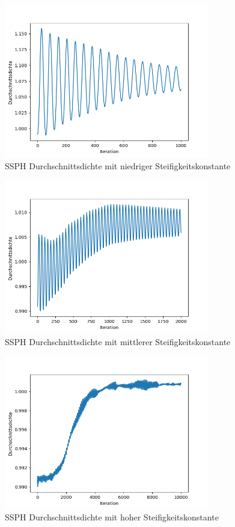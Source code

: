 \documentclass{scrreprt}
\begin{document}
\begin{figure}[htb]
    \includegraphics[width=0.8\textwidth]{average_density_ssph_low_stiffness.png}
    \caption{SSPH Durchschnittsdichte mit niedriger Steifigkeitskonstante}
    \label{image:average_density_ssph_low_stiffness}
\end{figure}

\begin{figure}[htb]
    \includegraphics[width=0.8\textwidth]{average_density_ssph_mid_stiffness.png}
    \caption{SSPH Durchschnittsdichte mit mittlerer Steifigkeitskonstante}
    \label{image:average_density_ssph_mid_stiffness}
\end{figure}

\begin{figure}[htb]
    \includegraphics[width=0.8\textwidth]{average_density_ssph_high_stiffness.png}
    \caption{SSPH Durchschnittsdichte mit hoher Steifigkeitskonstante}
    \label{image:average_density_ssph_high_stiffness}
\end{figure}
\end{document}
